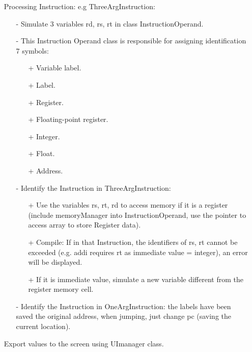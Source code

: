 \documentclass[10pt]{article}
\begin{document}
\begin{large}
\begin{itemize}
            \item[]
                Processing Instruction: e.g ThreeArgInstruction:
                \begin{itemize}
                    \item[-]
                        Simulate 3 variables rd, rs, rt in class InstructionOperand.
                    \item[-]
                        This Instruction Operand class is responsible for assigning identification 7 symbols:
                        \begin{itemize}
                            \item[+]Variable label.
                            \item[+]Label.
                            \item[+]Register.
                            \item[+]Floating-point register.
                            \item[+]Integer.
                            \item[+]Float.
                            \item[+]Address.
                        \end{itemize}
                    \item[-]
                        Identify the Instruction in ThreeArgInstruction:
                        \begin{itemize}
                            \item[+]
                                Use the variables rs, rt, rd to access memory if it is a register (include memoryManager into InstructionOperand, use the pointer to access array to store Register data).
                            \item[+]
                                Compile: If in that Instruction, the identifiers of rs, rt cannot be exceeded (e.g. addi requires rt as immediate value = integer), an error will be displayed.
                            \item[+]
                                If it is immediate value, simulate a new variable different from the register memory cell.
                        \end{itemize}
                    \item[-]
                        Identify the Instruction in OneArgInstruction: the labels have been saved the original address, when jumping, just change pc (saving the current location).
                \end{itemize}
            \item[]
                Export values to the screen using UImanager class.
        \end{itemize}

\end{large}
\end{document}
